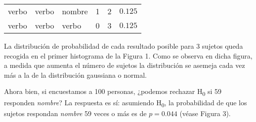 \documentclass[12pt,spanish,a4paper,]{article}
\begin{document}
\begin{longtable}[]{@{}llllll@{}}
\begin{minipage}[t]{0.13\columnwidth}\raggedright
verbo\strut
\end{minipage} & \begin{minipage}[t]{0.13\columnwidth}\raggedright
verbo\strut
\end{minipage} & \begin{minipage}[t]{0.13\columnwidth}\raggedright
nombre\strut
\end{minipage} & \begin{minipage}[t]{0.07\columnwidth}\raggedright
1\strut
\end{minipage} & \begin{minipage}[t]{0.07\columnwidth}\raggedright
2\strut
\end{minipage} & \begin{minipage}[t]{0.32\columnwidth}\raggedright
\(0.125\)\strut
\end{minipage}\tabularnewline
\begin{minipage}[t]{0.13\columnwidth}\raggedright
verbo\strut
\end{minipage} & \begin{minipage}[t]{0.13\columnwidth}\raggedright
verbo\strut
\end{minipage} & \begin{minipage}[t]{0.13\columnwidth}\raggedright
verbo\strut
\end{minipage} & \begin{minipage}[t]{0.07\columnwidth}\raggedright
0\strut
\end{minipage} & \begin{minipage}[t]{0.07\columnwidth}\raggedright
3\strut
\end{minipage} & \begin{minipage}[t]{0.32\columnwidth}\raggedright
\(0.125\)\strut
\end{minipage}\tabularnewline
\bottomrule
\end{longtable}

La distribución de probabilidad de cada resultado posible para 3 sujetos
queda recogida en el primer histograma de la Figura 1. Como se observa
en dicha figura, a medida que aumenta el número de sujetos la
distribución se asemeja cada vez más a la de la distribución gaussiana o
normal.

Ahora bien, si encuestamos a 100 personas, ¿podemos rechazar
H\textsubscript{0} si 59 responden \emph{nombre}? La respuesta es sí:
asumiendo H\textsubscript{0}, la probabilidad de que los sujetos
respondan \emph{nombre} 59 veces o más es de \(p = 0.044\) (véase Figura
3).
\end{document}
